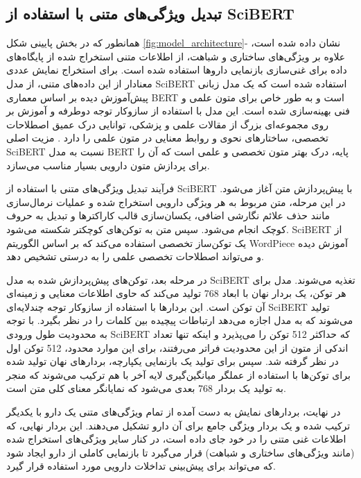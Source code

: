 \subsection{تبدیل ویژگی‌های متنی با استفاده از SciBERT}

همانطور که در بخش پایینی شکل \ref{fig:model_architecture}- نشان داده شده است، علاوه بر ویژگی‌های ساختاری و شباهت، از اطلاعات متنی استخراج شده از پایگاه‌های داده برای غنی‌سازی بازنمایی داروها استفاده شده است. برای استخراج نمایش عددی معنادار از این داده‌های متنی، از مدل SciBERT استفاده شده است که یک مدل زبانی پیش‌آموزش دیده بر اساس معماری BERT \cite{ref_devlin2018} است و به طور خاص برای متون علمی و فنی بهینه‌سازی شده است. این مدل با استفاده از سازوکار توجه دوطرفه و آموزش بر روی مجموعه‌ای بزرگ از مقالات علمی و پزشکی، توانایی درک عمیق اصطلاحات تخصصی، ساختارهای نحوی و روابط معنایی در متون علمی را دارد \cite{ref_beltagy2019}. مزیت اصلی SciBERT نسبت به مدل BERT پایه، درک بهتر متون تخصصی و علمی است که آن را برای پردازش متون دارویی بسیار مناسب می‌سازد.

فرآیند تبدیل ویژگی‌های متنی با استفاده از SciBERT با پیش‌پردازش متن آغاز می‌شود. در این مرحله، متن مربوط به هر ویژگی دارویی استخراج شده و عملیات نرمال‌سازی مانند حذف علائم نگارشی اضافی، یکسان‌سازی قالب کاراکترها و تبدیل به حروف کوچک انجام می‌شود. سپس متن به توکن‌های کوچکتر شکسته می‌شود. SciBERT از یک توکن‌ساز تخصصی استفاده می‌کند که بر اساس الگوریتم WordPiece آموزش دیده و می‌تواند اصطلاحات تخصصی علمی را به درستی تشخیص دهد.

در مرحله بعد، توکن‌های پیش‌پردازش شده به مدل SciBERT تغذیه می‌شوند. مدل برای هر توکن، یک بردار نهان با ابعاد 768 تولید می‌کند که حاوی اطلاعات معنایی و زمینه‌ای آن توکن است. این بردارها با استفاده از سازوکار توجه چندلایه‌ای SciBERT تولید می‌شوند که به مدل اجازه می‌دهد ارتباطات پیچیده بین کلمات را در نظر بگیرد. با توجه به محدودیت طول ورودی SciBERT که حداکثر 512 توکن را می‌پذیرد و اینکه تنها تعداد اندکی از متون از این محدودیت فراتر می‌رفتند، برای این موارد محدود، 512 توکن اول در نظر گرفته شد. سپس برای تولید یک بازنمایی یکپارچه، بردارهای نهان تولید شده برای توکن‌ها با استفاده از عملگر میانگین‌گیری لایه آخر با هم ترکیب می‌شوند که منجر به تولید یک بردار 768 بعدی می‌شود که نمایانگر معنای کلی متن است.

در نهایت، بردارهای نمایش به دست آمده از تمام ویژگی‌های متنی یک دارو با یکدیگر ترکیب شده و یک بردار ویژگی جامع برای آن دارو تشکیل می‌دهند. این بردار نهایی، که اطلاعات غنی متنی را در خود جای داده است، در کنار سایر ویژگی‌های استخراج شده (مانند ویژگی‌های ساختاری و شباهت) قرار می‌گیرد تا بازنمایی کاملی از دارو ایجاد شود که می‌تواند برای پیش‌بینی تداخلات دارویی مورد استفاده قرار گیرد.

